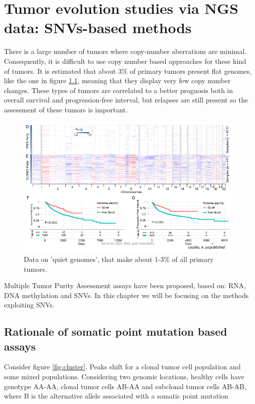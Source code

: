 \graphicspath{{chapters/notes/07/images/}}

\chapter{Tumor evolution studies via NGS data: SNVs-based methods}
There is a large number of tumors where copy-number aberrations are minimal.
Consequently, it is difficult to use copy number based approaches for these kind of tumors.
It is estimated that about 3\% of primary tumors present flat genomes, like the one in figure \ref{fig:quiet}, meaning that they display very few copy number changes.
These types of tumors are correlated to a better prognosis both in overall survival and progression-free interval, but relapses are still present so the assessment of these tumors is important.

\begin{figure}[H]
\centering
    \includegraphics[width=0.7\linewidth]{quiet_genome.png}
    \caption{Data on 'quiet genomes', that make about 1-3\% of all primary tumors.}
    \label{fig:quiet}
\end{figure}

Multiple Tumor Purity Assessment assays have been proposed, based on: RNA, DNA methylation and SNVs.
In this chapter we will be focusing on the methods exploiting SNVs.

\section{Rationale of somatic point mutation based assays}
Consider figure \ref{fig:cluster}. Peaks shift for a clonal tumor cell population and some mixed populations. Considering two genomic locations, healthy cells have genotype AA-AA, clonal tumor cells AB-AA and subclonal tumor cells AB-AB, where B is the alternative allele associated with a somatic point mutation

